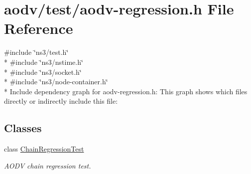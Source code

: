 \hypertarget{aodv-regression_8h}{}\section{aodv/test/aodv-\/regression.h File Reference}
\label{aodv-regression_8h}
{\ttfamily \#include \char`\"{}ns3/test.\+h\char`\"{}}\\*
{\ttfamily \#include \char`\"{}ns3/nstime.\+h\char`\"{}}\\*
{\ttfamily \#include \char`\"{}ns3/socket.\+h\char`\"{}}\\*
{\ttfamily \#include \char`\"{}ns3/node-\/container.\+h\char`\"{}}\\*
Include dependency graph for aodv-\/regression.h\+:
This graph shows which files directly or indirectly include this file\+:
\subsection*{Classes}
\begin{DoxyCompactItemize}
\item 
class \hyperlink{classChainRegressionTest}{Chain\+Regression\+Test}
\begin{DoxyCompactList}\small\item\em A\+O\+DV chain regression test. \end{DoxyCompactList}\end{DoxyCompactItemize}
